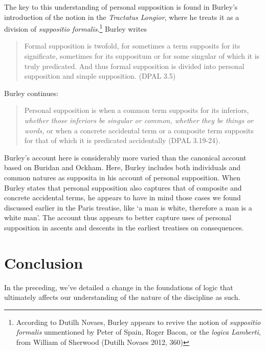\documentclass[a4paper,11pt]{article}
\begin{document}
The key to this understanding of personal supposition is found in Burley's introduction of the notion in the \textit{Tractatus Longior}, where he treats it as a division of \textit{suppositio formalis}.\footnote{According to Dutilh Novaes, Burley appears to revive the notion of \textit{suppositio formalis} unmentioned by Peter of Spain, Roger Bacon, or the \textit{logica Lamberti}, from William of Sherwood (Dutilh Novaes 2012, 360)} Burley writes
\begin{quote}
  Formal supposition is twofold, for sometimes a term supposits for its significate, sometimes for its suppositum or for some singular of which it is truly predicated. And thus formal supposition is divided into personal supposition and simple supposition. (DPAL 3.5)
\end{quote}
Burley continues:
\begin{quote}
  Personal supposition is when a common term supposits for its inferiors, \textit{whether those inferiors be singular or common, whether they be things or words,} or when a concrete accidental term or a composite term supposits for that of which it is predicated accidentally (DPAL 3.19-24).
\end{quote}
Burley's account here is considerably more varied than the canonical account based on Buridan and Ockham. Here, Burley includes both individuals and common natures as supposita in his account of personal supposition. When Burley states that personal supposition also captures that of composite and concrete accidental terms, he appears to have in mind those cases we found discussed earlier in the Paris treatise, like `a man is white, therefore a man is a white man'. The account thus appears to better capture uses of personal supposition in ascents and descents in the earliest treatises on consequences. 
\section{Conclusion}
In the preceding, we've detailed a change in the foundations of logic that ultimately affects our understanding of the nature of the discipline as such. 
\end{document}
